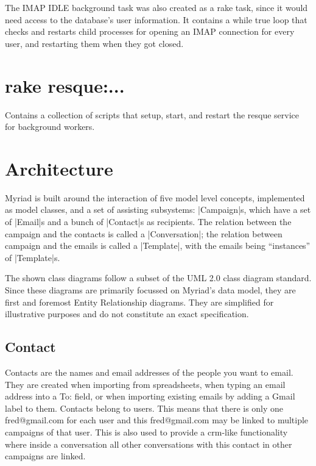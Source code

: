 The IMAP IDLE background task was also created as a rake task, since it would need access to the database's user information. It contains a while true loop that checks and restarts child processes for opening an IMAP connection for every user, and restarting them when they got closed.

\section{rake resque:...}

Contains a collection of scripts that setup, start, and restart the resque service for background workers.

\pagebreak
\section{Architecture}
\label{sec:Architecture}

Myriad is built around the interaction of five model level concepts, implemented as model classes, and a set of assisting subsystems:
|Campaign|s, which have a set of |Email|s and a bunch of |Contact|s as recipients. The relation between the campaign and the contacts is called a |Conversation|; the relation between campaign and the emails is called a |Template|, with the emails being ``instances'' of |Template|s.

The shown class diagrams follow a subset of the UML 2.0 class diagram standard\cite{uml}. Since these diagrams are primarily focussed on Myriad's data model, they are first and foremost Entity Relationship diagrams. They are simplified for illustrative purposes and do not constitute an exact specification.



\subsection{Contact}

Contacts are the names and email addresses of the people you want to email.
They are created when importing from spreadsheets, when typing an email address into a To: field, or when importing existing emails by adding a Gmail label to them. Contacts belong to users. This means that there is only one fred@gmail.com for each user and this fred@gmail.com may be linked to multiple campaigns of that user. This is also used to provide a \gls{crm}-like functionality where inside a conversation all other conversations with this contact in other campaigns are linked.

